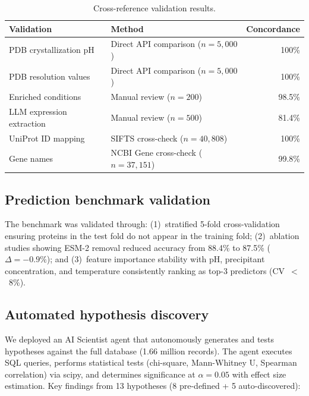 \documentclass[11pt]{article}
\begin{document}
\begin{table}[H]
\centering
\caption{Cross-reference validation results.}
\label{tab:crossref}
\small
\begin{tabular}{llr}
\toprule
\textbf{Validation} & \textbf{Method} & \textbf{Concordance} \\
\midrule
PDB crystallization pH & Direct API comparison ($n = 5{,}000$) & 100\% \\
PDB resolution values & Direct API comparison ($n = 5{,}000$) & 100\% \\
Enriched conditions & Manual review ($n = 200$) & 98.5\% \\
LLM expression extraction & Manual review ($n = 500$) & 81.4\% \\
UniProt ID mapping & SIFTS cross-check ($n = 40{,}808$) & 100\% \\
Gene names & NCBI Gene cross-check ($n = 37{,}151$) & 99.8\% \\
\bottomrule
\end{tabular}
\end{table}

\subsection*{Prediction benchmark validation}

The benchmark was validated through: (1)~stratified 5-fold cross-validation ensuring proteins in the test fold do not appear in the training fold; (2)~ablation studies showing ESM-2 removal reduced accuracy from 88.4\% to 87.5\% ($\Delta = -0.9\%$); and (3)~feature importance stability with pH, precipitant concentration, and temperature consistently ranking as top-3 predictors (CV~$<$~8\%).

\subsection*{Automated hypothesis discovery}

We deployed an AI Scientist agent that autonomously generates and tests hypotheses against the full database (1.66 million records). The agent executes SQL queries, performs statistical tests (chi-square, Mann-Whitney U, Spearman correlation) via scipy, and determines significance at $\alpha = 0.05$ with effect size estimation. Key findings from 13 hypotheses (8 pre-defined + 5 auto-discovered):
\end{document}
